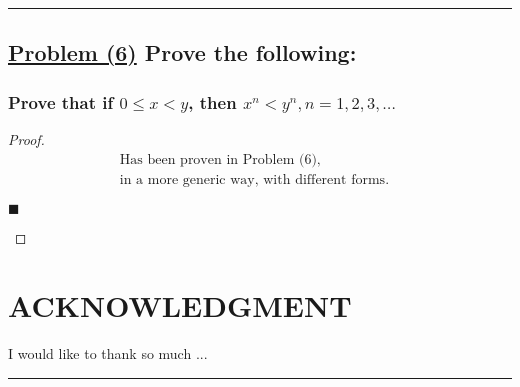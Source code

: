 \documentclass[letterpaper, 10 pt, conference]{ieeeconf}  %
\begin{document}
\noindent\rule{8cm}{0.4pt}
\begin{figure}[thpb]
      \centering
\end{figure}
\subsection{\textbf{\underline{Problem (6)} Prove the following:}}

\subsubsection{\textbf{Prove that if $0 \leq x < y$, then $x^n < y^n, n = 1, 2, 3, \ldots $}}

\begin{proof}
\begin{align}
    & \text{Has been proven in Problem (6),} && \\
    & \text{in a more generic way, with different forms.}
\end{align}
\begin{flushright}
$\blacksquare$
\end{flushright}
\end{proof}










\newpage

\section*{ACKNOWLEDGMENT}
I would like to thank so much ...

\noindent\rule{8cm}{0.4pt}
\end{document}
